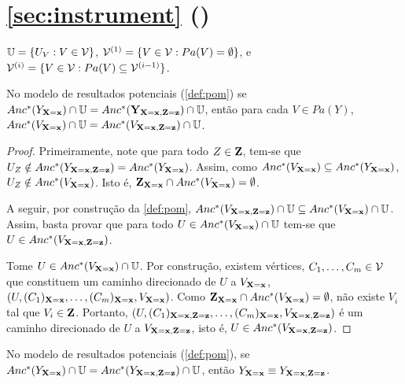 \section{\cref{sec:instrument} ()}

\begin{definition}
 \label{def:pom_partition}
 $\U = \{U_V: V \in \sV\}$,
 $\sV^{(1)} = \{V \in \sV: Pa(V) = \emptyset\}$, e
 $\sV^{(i)} = \{V \in \sV: Pa(V) \subseteq \sV^{(i-1)}\}$.
\end{definition}

\begin{lemma}
 \label{lemma:pom_anc}
 No modelo de resultados potenciais (\cref{def:pom})
 se $Anc^*(Y_{\X=\x}) \cap \U = Anc^*(\Y_{\X=\x,\Z=\z}) \cap \U$,
 então para cada $V \in Pa(Y)$,
 $Anc^*(V_{\X=\x}) \cap \U = Anc^*(V_{\X=\x,\Z=\z}) \cap \U$.
\end{lemma}

\begin{proof}
 Primeiramente, note que
 para todo $Z \in \Z$, 
 tem-se que $U_Z \notin Anc^*(Y_{\X=\x,\Z=\z}) = Anc^*(Y_{\X=\x})$.
 Assim, como $Anc^*(V_{\X=\x}) \subseteq Anc^*(Y_{\X=\x})$,
 $U_Z \notin Anc^*(V_{\X=\x})$. Isto é,
 $\Z_{\X=\x} \cap Anc^*(V_{\X=\x}) = \emptyset$.
 
 A seguir, por construção da \cref{def:pom},
 $Anc^*(V_{\X=\x,\Z=\z}) \cap \U \subseteq Anc^*(V_{\X=\x}) \cap \U$.
 Assim, basta provar que para todo $U \in Anc^*(V_{\X=\x}) \cap \U$ 
 tem-se que $U \in Anc^*(V_{\X=\x,\Z=\z})$.
 
 Tome $U \in Anc^*(V_{\X=\x}) \cap \U$.
 Por construção, existem vértices, $C_1,\ldots,C_m \in \sV$ 
 que constituem um caminho direcionado de 
 $U$ a $V_{\X=\x}$,
 $(U,(C_1)_{\X=\x},\ldots,(C_m)_{\X=\x},V_{\X=\x})$.
 Como $\Z_{\X=\x} \cap Anc^*(V_{\X=\x}) = \emptyset$,
 não existe $V_i$ tal que $V_i \in \Z$. Portanto,
 $(U,(C_1)_{\X=\x,\Z=\z},\ldots,(C_m)_{\X=\x},V_{\X=\x,\Z=\z})$ é
 um caminho direcionado de $U$ a $V_{\X=\x,\Z=\z}$, isto é,
 $U \in Anc^*(V_{\X=\x,\Z=\z})$.
\end{proof}

\begin{lemma}
 \label{lemma:pom_equiv_1}
 No modelo de resultados potenciais (\cref{def:pom}),
 se $Anc^*(Y_{\X=\x}) \cap \U = Anc^*(Y_{\X=\x,\Z=\z}) \cap \U$, então
 $Y_{\X=\x} \equiv Y_{\X=\x,\Z=\z}$.
\end{lemma}

